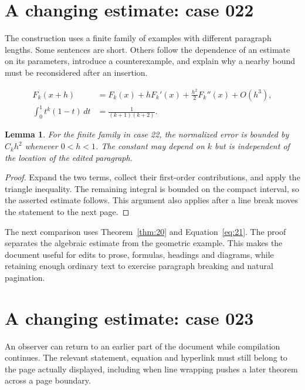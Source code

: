 \documentclass[a4paper,10pt]{article}
\newtheorem{lemma}[theorem]{Lemma}
\begin{document}
\lipsum[3]

\section{A changing estimate: case 022}\label{unit:21}
The construction uses a finite family of examples with different paragraph lengths. Some sentences are short. Others follow the dependence of an estimate on its parameters, introduce a counterexample, and explain why a nearby bound must be reconsidered after an insertion.

\lipsum[4-5]
\begin{align}\label{eq:21}
 F_k(x+h)&=F_k(x)+hF_k'(x)+\frac{h^2}{2}F_k''(x)+O(h^3),\\
 \int_0^1 t^k(1-t)\,dt&=\frac{1}{(k+1)(k+2)}.
\end{align}
\begin{lemma}\label{thm:21}
For the finite family in case 22, the normalized error is bounded by $C_k h^2$ whenever $0<h<1$. The constant may depend on $k$ but is independent of the location of the edited paragraph.
\end{lemma}
\begin{proof}
Expand the two terms, collect their first-order contributions, and apply the
triangle inequality. The remaining integral is bounded on the compact interval,
so the asserted estimate follows. This argument also applies after a line break
moves the statement to the next page.
\end{proof}
\begin{center}
\end{center}
The next comparison uses Theorem~\ref{thm:20} and Equation~\ref{eq:21}. The proof separates the algebraic estimate from the geometric example. This makes the document useful for edits to prose, formulas, headings and diagrams, while retaining enough ordinary text to exercise paragraph breaking and natural pagination.

\lipsum[8]

\section{A changing estimate: case 023}\label{unit:22}
An observer can return to an earlier part of the document while compilation continues. The relevant statement, equation and hyperlink must still belong to the page actually displayed, including when line wrapping pushes a later theorem across a page boundary.
\end{document}
